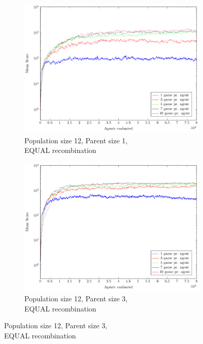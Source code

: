 \begin{figure}
	\centering
	\captionsetup[subfigure]{justification=centering}
    \begin{subfigure}[b]{0.49\textwidth}
    	\caption{Population size 12, Parent size 1,\\EQUAL recombination}
        \includegraphics[width=\textwidth]{data/cma_population_offspring/12x_split/equal_l12_o1/mean/PlotFile.pdf}
    \end{subfigure} 
    \begin{subfigure}[b]{0.49\textwidth}
    	\caption{Population size 12, Parent size 3,\\EQUAL recombination}
        \includegraphics[width=\textwidth]{data/cma_population_offspring/12x_split/equal_l12_o3/mean/PlotFile.pdf}

\end{subfigure}
\end{figure}
